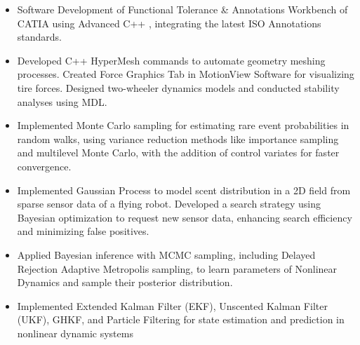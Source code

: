 \documentclass[10pt,a4paper,ragged2e,withhyper]{altacv}
\begin{document}
\begin{paracol}{2}
\switchcolumn
{}




\begin{itemize}
\item Software Development of Functional Tolerance \& Annotations Workbench of CATIA using Advanced C++ , integrating the latest ISO Annotations standards.
\end{itemize}

\divider

\begin{itemize}
\item Developed C++ HyperMesh commands to automate geometry meshing processes. Created Force Graphics Tab in MotionView Software for visualizing tire forces. Designed two-wheeler dynamics models and conducted stability analyses using MDL.
\end{itemize}

\divider


\end{paracol}

\begin{itemize}
    \item  Implemented Monte Carlo sampling for estimating rare event probabilities in random walks, using variance reduction methods like importance sampling and multilevel Monte Carlo, with the addition of control variates for faster convergence.
    \item Implemented Gaussian Process to model scent distribution in a 2D field from sparse sensor data of a flying robot. Developed a search strategy using Bayesian optimization to request new sensor data, enhancing search efficiency and minimizing false positives.
    \item  Applied Bayesian inference with MCMC sampling, including Delayed Rejection Adaptive Metropolis sampling, to learn parameters of Nonlinear Dynamics and sample their posterior distribution.
    \item  Implemented Extended Kalman Filter (EKF), Unscented Kalman Filter (UKF), GHKF, and Particle Filtering for state estimation and prediction in nonlinear dynamic systems
\end{itemize}
\end{document}

